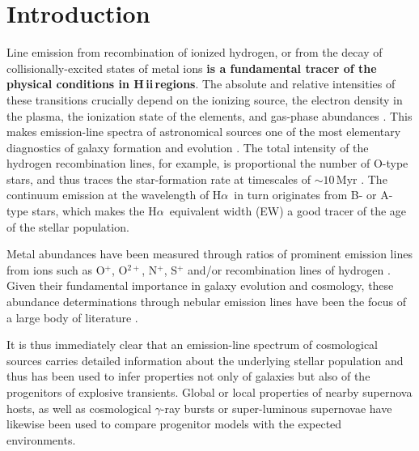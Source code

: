 \documentclass[traditabstract, referee]{aa}
\newcommand{\ha}{H$\alpha$}
\newcommand{\hii}{\mbox{H\,{\sc ii}}}
\begin{document}
\maketitle

\section{Introduction}
\label{sec:Intro}

Line emission from recombination of ionized hydrogen, or from the decay of collisionally-excited states of metal ions \textbf{is a fundamental tracer of the physical conditions in \hii\,regions}. The absolute and relative intensities of these transitions crucially depend on the ionizing source, the electron density in the plasma, the ionization state of the elements, and gas-phase abundances \citep{1989agna.book.....O}. This makes emission-line spectra of astronomical sources one of the most elementary diagnostics of galaxy formation and evolution \citep[e.g.][]{2004ApJ...613..898T, 2006ApJ...644..813E, 2009ApJ...706.1364F}. The total intensity of the hydrogen recombination lines, for example, is proportional the number of O-type stars, and thus traces the star-formation rate at timescales of $\sim10$\,Myr \citep[e.g.][]{1998ARA&A..36..189K}. The continuum emission at the wavelength of \ha\, in turn originates from B- or A-type stars, which makes the \ha\, equivalent width (EW) a good tracer of the age of the stellar population.

Metal abundances have been measured through ratios of prominent emission lines from ions such as O$^{+}$, O$^{2+}$, N$^{+}$, S$^{+}$ and/or recombination lines of hydrogen \citep{1979MNRAS.189...95P, 1979A&A....78..200A}. Given their fundamental importance in galaxy evolution and cosmology, these abundance determinations through nebular emission lines have been the focus of a large body of literature \citep[e.g.][]{2004ApJ...617..240K, 2005ApJ...631..231P, 2006A&A...454L.127S, 2006A&A...448..955I, 2008ApJ...681.1183K}.

It is thus immediately clear that an emission-line spectrum of cosmological sources carries detailed information about the underlying stellar population and thus has been used to infer properties not only of galaxies but also of the progenitors of explosive transients. Global \citep[e.g.][]{2008ApJ...673..999P, 2011MNRAS.412.1441L} or local \citep[e.g.][]{2010MNRAS.407.2660A, 2011ApJ...731L...4M, 2011A&A...530A..95L} properties of nearby supernova hosts, as well as cosmological $\gamma$-ray bursts \citep[GRBs, e.g.][]{2007A&A...464..529W, 2012A&A...546A...8K, 2013ApJ...774..119G} or super-luminous supernovae \citep[e.g.][]{2013ApJ...763L..28C, 2014ApJ...787..138L, 2014arXiv1409.8331L, 2016arXiv160408207P} have likewise been used to compare progenitor models with the expected environments. 
\end{document}

